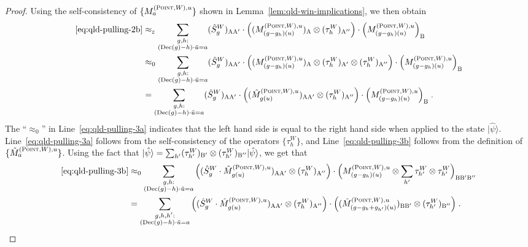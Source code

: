 \documentclass[11pt]{article}
\theoremstyle{definition}
\newcommand{\ket}[1]{|#1\rangle}
\newcommand{\eps}{\varepsilon}
\newcommand{\labelstyle}[1]{\ensuremath{\textsc{#1}}\xspace}
\newcommand{\alice}{\labelstyle{A}}
\newcommand{\bob}{\labelstyle{B}}
\newcommand{\typestyle}[1]{\ensuremath{\textsc{#1}}\xspace}
\newcommand{\Point}{\typestyle{Point}}
\newcommand{\coded}{\mathrm{Dec}}
\begin{document}
\begin{proof}
	Using the self-consistency of $\{M^{(\Point,W),u}_a\}$ shown in Lemma~\ref{lem:qld-win-implications}, we then obtain
	\begin{align}
		\text{\eqref{eq:qld-pulling-2b}} &\approx_{\eps} \sum_{\substack{g,h: \\ (\coded(g)-h)\cdot \tilde{u} = a}} (\hat{S}^W_g)_{\alice \alice'} \cdot \Big((M^{(\Point,W),u}_{(g-g_h)(u)})_{\alice} \otimes (\tau_h^W)_{\alice''} \Big) \cdot \Big ( M^{(\Point,W),u}_{(g-g_h)(u)} \Big)_{\bob} \label{eq:qld-pulling-3} \\
		&\approx_{0}\sum_{\substack{g,h: \\ (\coded(g)-h)\cdot \tilde{u} = a}} (\hat{S}^W_g)_{\alice \alice'} \cdot \Big((M^{(\Point,W),u}_{(g-g_h)(u)})_{\alice} \otimes (\tau_h^W)_{\alice'} \otimes (\tau_h^W)_{\alice''} \Big) \cdot \Big ( M^{(\Point,W),u}_{(g-g_h)(u)} \Big)_{\bob} \label{eq:qld-pulling-3a} \\
		&= \sum_{\substack{g,h: \\ (\coded(g)-h)\cdot \tilde{u} = a}} (\hat{S}^W_g)_{\alice \alice'} \cdot \Big((\hat{M}^{(\Point,W),u}_{g(u)})_{\alice \alice'} \otimes (\tau_h^W)_{\alice''} \Big) \cdot \Big ( M^{(\Point,W),u}_{(g-g_h)(u)} \Big)_{\bob} \;. \label{eq:qld-pulling-3b}
	\end{align}
	The ``$\approx_0$'' in Line~\eqref{eq:qld-pulling-3a} indicates that the left hand side is equal to the right hand side when applied to the state $\ket{\hat{\psi}}$. Line~\eqref{eq:qld-pulling-3a} follows from the self-consistency of the operators $\{\tau^W_h\}$, and Line~\eqref{eq:qld-pulling-3b} follows from the definition of $\{ \hat{M}^{(\Point,W),u}_a\}$. Using the fact that $\ket{\hat{\psi}} = \sum_{h'} (\tau^W_{h'})_{\bob'} \otimes (\tau^W_{h'})_{\bob''} \ket{\hat{\psi}}$, we get that 
	\begin{align}
	\text{\eqref{eq:qld-pulling-3b}} & \approx_0 \sum_{\substack{g,h: \\ (\coded(g)-h)\cdot \tilde{u} = a}} \Big((\hat{S}^W_g \cdot \hat{M}^{(\Point,W),u}_{g(u)})_{\alice \alice'} \otimes (\tau_h^W)_{\alice''} \Big) \cdot \Big( M^{(\Point,W),u}_{(g-g_h)(u)} \otimes \sum_{h'} \tau_{h'}^W \otimes \tau_{h'}^W\Big)_{\bob \bob' \bob''} \label{eq:qld-pulling-4} \\
		&= \sum_{\substack{g,h,h': \\ (\coded(g)-h)\cdot \tilde{u} = a}} \Big((\hat{S}^W_g \cdot \hat{M}^{(\Point,W),u}_{g(u)})_{\alice \alice'} \otimes (\tau_h^W)_{\alice''} \Big) \cdot \Big( (\hat{M}^{(\Point,W),u}_{(g-g_h+g_{h'})(u)})_{\bob \bob'} \otimes (\tau_{h'}^W)_{\bob''} \Big) \;. \label{eq:qld-pulling-5}

\end{align}
\end{proof}
\end{document}
